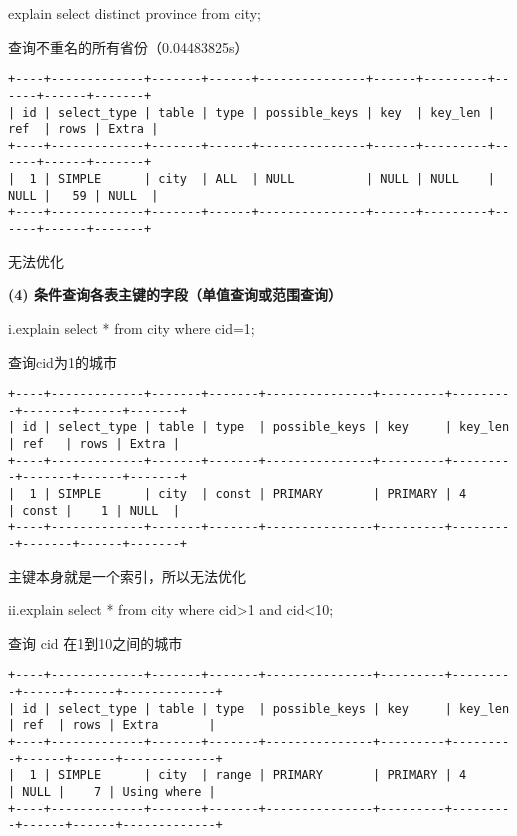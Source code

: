 \documentclass[a4paper, 11pt, nofonts, nocap, fancyhdr]{ctexart}
\begin{document}
explain select distinct province from city;

查询不重名的所有省份（0.04483825s）

\begin{verbatim}
+----+-------------+-------+------+---------------+------+---------+------+------+-------+
| id | select_type | table | type | possible_keys | key  | key_len | ref  | rows | Extra |
+----+-------------+-------+------+---------------+------+---------+------+------+-------+
|  1 | SIMPLE      | city  | ALL  | NULL          | NULL | NULL    | NULL |   59 | NULL  |
+----+-------------+-------+------+---------------+------+---------+------+------+-------+
\end{verbatim}

无法优化

\vspace{0.7cm}

\textbf{(4) 条件查询各表主键的字段（单值查询或范围查询）} 

i.explain select * from city where cid=1;

查询cid为1的城市

\begin{verbatim}
+----+-------------+-------+-------+---------------+---------+---------+-------+------+-------+
| id | select_type | table | type  | possible_keys | key     | key_len | ref   | rows | Extra |
+----+-------------+-------+-------+---------------+---------+---------+-------+------+-------+
|  1 | SIMPLE      | city  | const | PRIMARY       | PRIMARY | 4       | const |    1 | NULL  |
+----+-------------+-------+-------+---------------+---------+---------+-------+------+-------+
\end{verbatim}

主键本身就是一个索引，所以无法优化

ii.explain select * from city where cid>1 and cid<10;

查询 cid 在1到10之间的城市 

\begin{verbatim}
+----+-------------+-------+-------+---------------+---------+---------+------+------+-------------+
| id | select_type | table | type  | possible_keys | key     | key_len | ref  | rows | Extra       |
+----+-------------+-------+-------+---------------+---------+---------+------+------+-------------+
|  1 | SIMPLE      | city  | range | PRIMARY       | PRIMARY | 4       | NULL |    7 | Using where |
+----+-------------+-------+-------+---------------+---------+---------+------+------+-------------+
\end{verbatim}
\end{document}
